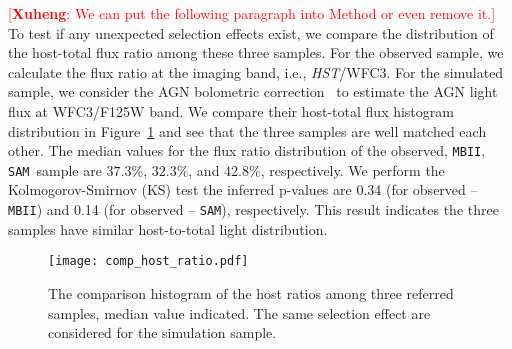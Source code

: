 \documentclass{natureprintstyle}
\newcommand{\hst}{{\it HST}}
\newcommand{\sam}{\texttt{SAM}}
\newcommand{\mbii}{\texttt{MBII}}
\newcommand{\ding}[1]{\textcolor{red}{[{\bf Xuheng}: #1]}}
\begin{document}

 \ding{We can put the following paragraph into Method or even remove it.} To test if any unexpected selection effects exist, we compare the distribution of the host-total flux ratio among these three samples. For the observed sample, we calculate the flux ratio at the imaging band, i.e., \hst/WFC3. For the simulated sample, we consider the AGN bolometric correction~\cite{Elvis1994} to estimate the AGN light flux at WFC3/F125W band. We compare their host-total flux histogram distribution in Figure~\ref{fig:comp_hist} and see that the three samples are well matched each other. The median values for the flux ratio distribution of the observed, \mbii, \sam\ sample are $37.3\%$, $32.3\%$, and $42.8\%$, respectively. We perform the Kolmogorov-Smirnov (KS) test the inferred p-values are 0.34 (for observed -- \mbii) and 0.14 (for observed -- \sam), respectively. This result indicates the three samples have similar host-to-total light distribution.

\begin{figure}[t]
\texttt{[image: comp\_host\_ratio.pdf]}
\caption{The comparison histogram of the host ratios among three referred samples, median value indicated. The same selection effect are considered for the simulation sample.
}
\label{fig:comp_hist}
\end{figure}
\end{document}
